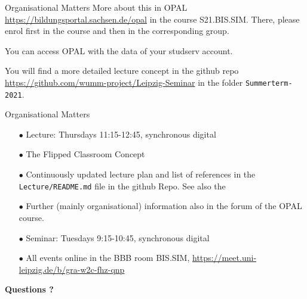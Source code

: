 \documentclass{beamer}
\begin{document}
\begin{frame}{Organisational Matters}
More about this in OPAL \url{https://bildungsportal.sachsen.de/opal} in the
course S21.BIS.SIM.  There, please enrol first in the course and then in the
corresponding group.

You can access OPAL with the data of your studserv account.

You will find a more detailed lecture concept in the github repo
\url{https://github.com/wumm-project/Leipzig-Seminar} in the folder
\texttt{Summerterm-2021}.

\end{frame}

\begin{frame}{Organisational Matters}

\begin{itemize}
\item[$\bullet$] Lecture: Thursdays 11:15-12:45, synchronous digital
\item[$\bullet$] The Flipped Classroom Concept
\item[$\bullet$] Continuously updated lecture plan and list of references in
  the \texttt{Lecture/README.md} file in the github Repo.  See also the
\item[$\bullet$] Further (mainly organisational) information also in the forum
  of the OPAL course.
\item[$\bullet$] Seminar: Tuesdays 9:15-10:45, synchronous digital
\item[$\bullet$] All events online in the BBB room BIS.SIM,
  \url{https://meet.uni-leipzig.de/b/gra-w2c-fhz-qnp}
\end{itemize}
\begin{center}\LARGE\bf
  Questions ?
\end{center}

\end{frame}
\end{document}
